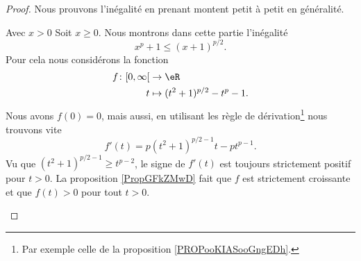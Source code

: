 \begin{proof}
    Nous prouvons l'inégalité en prenant montent petit à petit en généralité.
    \begin{subproof}
        \item[Avec \( x>0\)]
            Soit \( x\geq 0\). Nous montrons dans cette partie l'inégalité
            \begin{equation}        \label{EQooDJBNooEyfNtq}
                x^p+1\leq (x+1)^{p/2}.
            \end{equation}
            Pour cela nous considérons la fonction
            \begin{equation}
                \begin{aligned}
                    f\colon \mathopen[ 0 , \infty \mathclose[&\to \eR \\
                        t&\mapsto (t^2+1)^{p/2}-t^p-1. 
                \end{aligned}
            \end{equation}
            Nous avons \( f(0)=0\), mais aussi, en utilisant les règle de dérivation\footnote{Par exemple celle de la proposition \ref{PROPooKIASooGngEDh}.} nous trouvons vite
            \begin{equation}
                f'(t)=p(t^2+1)^{p/2-1}t-pt^{p-1}.
            \end{equation}
            Vu que \( (t^2+1)^{p/2-1}\geq t^{p-2}\), le signe de \( f'(t)\) est toujours strictement positif pour \( t>0\). La proposition \ref{PropGFkZMwD} fait que \( f\) est strictement croissante et que \( f(t)>0\) pour tout \( t>0\).


\end{subproof}
\end{proof}
